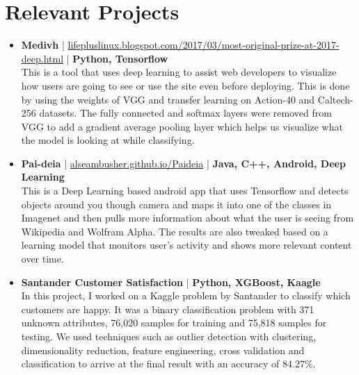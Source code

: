 \section{Relevant Projects}
\begin{itemize}
 \item \textbf{Medivh} | \href{http://lifepluslinux.blogspot.com/2017/03/most-original-prize-at-2017-deep.html}{lifepluslinux.blogspot.com/2017/03/most-original-prize-at-2017-deep.html} | \textbf{Python, Tensorflow}\\
 This is a tool that uses deep learning to assist web developers to visualize how users are going to see or use the site even before deploying. This is done by using the weights of VGG and transfer learning on Action-40 and Caltech-256 datasets. The fully connected and softmax layers were removed from VGG to add a gradient average pooling layer which helps us visualize what the model is looking at while classifying. 

 \item \textbf{Pai-deia} | \href{http://alseambusher.github.io/Paideia}{alseambusher.github.io/Paideia} | \textbf{Java, C++, Android, Deep Learning}\\
 This is a Deep Learning based android app that uses Tensorflow and detects objects around you though camera and maps it into one of the classes in Imagenet and then pulls more information about what the user is seeing from Wikipedia and Wolfram Alpha. The results are also tweaked based on a learning model that monitors user's activity and shows more relevant content over time.

 \item \textbf{Santander Customer Satisfaction} | \textbf{Python, XGBoost, Kaagle}\\
In this project, I worked on a Kaggle problem by Santander to classify which customers are happy. It was a binary classification problem with 371 unknown attributes, 76,020 samples for training and 75,818 samples for testing. We used techniques such as outlier detection with clustering, dimensionality reduction, feature engineering, cross validation and classification to arrive at the final result with an accuracy of 84.27\%.



\end{itemize}
